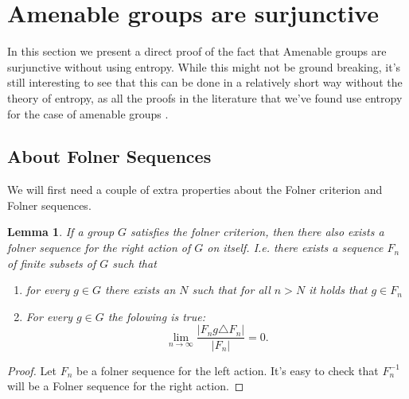 \documentclass[titlepage, a4paper]{article}
\newcommand{\card}[1]{\left| #1 \right|}
\newtheorem{lemma}[theorem]{Lemma}
\theoremstyle{remark}
\begin{document}
	
\section{Amenable groups are surjunctive}
In this section we present a direct proof of the fact that Amenable groups are surjunctive without using entropy. While this might not be ground breaking, it's still interesting to see that this can be done in a relatively short way without the theory of entropy, as all the proofs in the literature that we've found use entropy for the case of amenable groups \cite{weiss_2000} \cite{kerr_li_2010}.
\subsection{About Folner Sequences}
We will first need a couple of extra properties about the Folner criterion and Folner sequences.
\begin{lemma}\label{lem:right_folner_sequence}
	If a group $G$ satisfies the folner criterion, then there also exists a folner sequence for the right action of $G$ on itself. 
	I.e. there exists a sequence $F_n$ of finite subsets of $G$ such that 
		\begin{enumerate}
		\item for every $g \in G$ there exists an  $N$ such that for all $n >N$ it holds that $g \in F_n$ 
		\item For every $g \in G$ the folowing is true: \[
				\lim_{n \to \infty} \frac{\card{F_ng \triangle F_n}}{\card{F_n}} = 0
		.\] 
	\end{enumerate}
\end{lemma}
\begin{proof}
	Let $F_n$ be a folner sequence for the left action. 
	It's easy to check that $F_n^{-1}$ will be a Folner sequence for the right action. 
\end{proof}
\end{document}
